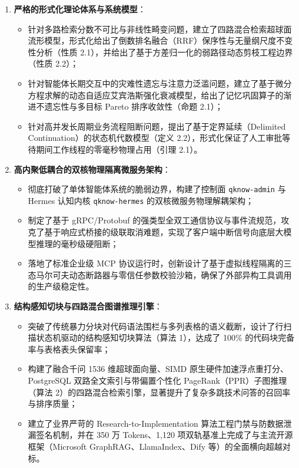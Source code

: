 \begin{enumerate}
    \item \textbf{严格的形式化理论体系与系统模型}：
    \begin{itemize}
        \item 针对多路检索分数不可比与非线性畸变问题，建立了四路混合检索超球面流形模型，形式化给出了倒数排名融合（RRF）保序性与无量纲尺度不变性分析（性质 2.1），并给出了基于方差归一化的弱路径动态剪枝工程边界（性质 2.2）；
        \item 针对智能体长期交互中的灾难性遗忘与注意力泛滥问题，建立了基于微分方程求解的动态自适应艾宾浩斯强化衰减模型，给出了记忆巩固算子的渐进不遗忘性与多目标 Pareto 排序收敛性（命题 2.1）；
        \item 针对高并发长周期业务流程阻断问题，提出了基于定界延续（Delimited Continuation）的状态机代数模型（定义 2.2），形式化保证了人工审批等待期间工作线程的零毫秒物理占用（引理 2.1）。
    \end{itemize}

    \item \textbf{高内聚低耦合的双核物理隔离微服务架构}：
    \begin{itemize}
        \item 彻底打破了单体智能体系统的脆弱边界，构建了控制面 \texttt{qknow-admin} 与 Hermes 认知内核 \texttt{qknow-hermes} 的双核微服务物理解耦架构；
        \item 制定了基于 gRPC/Protobuf 的强类型全双工通信协议与事件流规范，攻克了基于响应式桥接的级联取消难题，实现了客户端中断信号向底层大模型推理的毫秒级硬阻断；
        \item 落地了标准企业级 MCP 协议运行时，创新设计了基于虚拟线程隔离的三态马尔可夫动态断路器与零信任参数校验沙箱，确保了外部异构工具调用的生产级稳定性。
    \end{itemize}

    \item \textbf{结构感知切块与四路混合图谱推理引擎}：
    \begin{itemize}
        \item 突破了传统暴力分块对代码语法围栏与多列表格的语义截断，设计了行扫描状态机驱动的结构感知切块算法（算法 1），达成了 100\% 的代码块完备率与表格表头保留率；
        \item 构建了融合千问 1536 维超球面向量、SIMD 原生硬件加速浮点重打分、PostgreSQL 双路全文索引与带偏置个性化 PageRank（PPR）子图推理（算法 2）的四路混合检索引擎，显著提升了复杂多跳技术问答的召回率与排序质量；
        \item 建立了业界严苛的 Research-to-Implementation 算法工程门禁与防数据泄漏签名机制，并在 350 万 Tokens、1,120 项双轨基准上完成了与主流开源框架（Microsoft GraphRAG、LlamaIndex、Dify 等）的全面横向超越对标。
    \end{itemize}


\end{enumerate}
